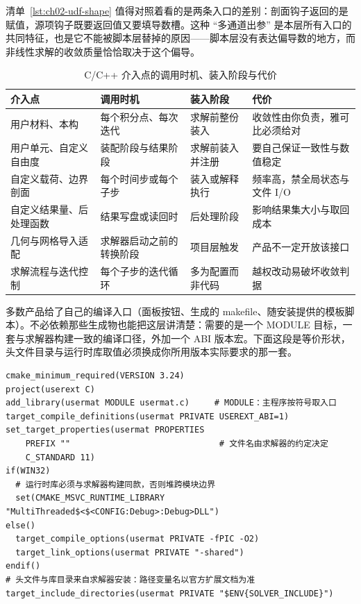 \documentclass[12pt,a4paper,fontset=fandol]{ctexbook}
\begin{document}
清单~\ref{lst:ch02-udf-shape} 值得对照着看的是两条入口的差别：剖面钩子返回的是赋值，源项钩子既要返回值又要填导数槽。这种 ``多通道出参'' 是本层所有入口的共同特征，也是它不能被脚本层替掉的原因——脚本层没有表达偏导数的地方，而非线性求解的收敛质量恰恰取决于这个偏导。

\begin{table}[htbp]
\centering
\caption{C/C++ 介入点的调用时机、装入阶段与代价}
\label{tab:ch02-hooks}
\begin{tabular}{>{\raggedright\arraybackslash}p{}
                >{\raggedright\arraybackslash}p{}
                >{\raggedright\arraybackslash}p{}
                >{\raggedright\arraybackslash}p{}}
\toprule
\textbf{介入点} & \textbf{调用时机} & \textbf{装入阶段} & \textbf{代价} \\
\midrule
用户材料、本构 & 每个积分点、每次迭代 & 求解前整份装入 & 收敛性由你负责，雅可比必须给对 \\
用户单元、自定义自由度 & 装配阶段与结果阶段 & 求解前装入并注册 & 要自己保证一致性与数值稳定 \\
自定义载荷、边界剖面 & 每个时间步或每个子步 & 装入或解释执行 & 频率高，禁全局状态与文件 I/O \\
自定义结果量、后处理函数 & 结果写盘或读回时 & 后处理阶段 & 影响结果集大小与取回成本 \\
几何与网格导入适配 & 求解器启动之前的转换阶段 & 项目层触发 & 产品不一定开放该接口 \\
求解流程与迭代控制 & 每个子步的迭代循环 & 多为配置而非代码 & 越权改动易破坏收敛判据 \\
\bottomrule
\end{tabular}
\end{table}

多数产品给了自己的编译入口（面板按钮、生成的 makefile、随安装提供的模板脚本）。不必依赖那些生成物也能把这层讲清楚：需要的是一个 MODULE 目标，一套与求解器构建一致的编译口径，外加一个 ABI 版本宏。下面这段是等价形状，头文件目录与运行时库取值必须换成你所用版本实际要求的那一套。

\begin{lstlisting}[language=CMakeLD, style=cmakestyle,
  caption={把用户例程编成可装入模块：口径与求解器构建对齐},
  label={lst:ch02-build}]
cmake_minimum_required(VERSION 3.24)
project(userext C)
add_library(usermat MODULE usermat.c)     # MODULE：主程序按符号取入口
target_compile_definitions(usermat PRIVATE USEREXT_ABI=1)
set_target_properties(usermat PROPERTIES
    PREFIX ""                              # 文件名由求解器的约定决定
    C_STANDARD 11)
if(WIN32)
  # 运行时库必须与求解器构建同款，否则堆跨模块边界
  set(CMAKE_MSVC_RUNTIME_LIBRARY "MultiThreaded$<$<CONFIG:Debug>:Debug>DLL")
else()
  target_compile_options(usermat PRIVATE -fPIC -O2)
  target_link_options(usermat PRIVATE "-shared")
endif()
# 头文件与库目录来自求解器安装：路径变量名以官方扩展文档为准
target_include_directories(usermat PRIVATE "$ENV{SOLVER_INCLUDE}")
\end{lstlisting}
\end{document}
